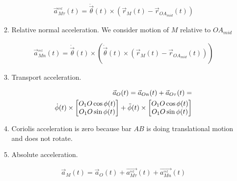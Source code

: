 \begin{enumerate}
\begin{enumerate}
\begin{answer}
\begin{align}
                            \vec{a}^{_{rel}}_{M\tau}(t) =  \ddot{\vec{\theta}}(t) \times (\vec{r}_{M}(t) - \vec{r}_{OA_{mid}}(t))
                        \end{align}
                    \end{answer}
              \item Relative normal acceleration. We consider motion of $M$ relative to $OA_{mid}$
                    \begin{answer}
                        \begin{align}
                            \vec{a}^{_{rel}}_{Mn}(t) =  \dot{\vec{\theta}}(t) \times (\dot{\vec{\theta}}(t) \times (\vec{r}_{M}(t) - \vec{r}_{OA_{mid}}(t)))
                        \end{align}
                    \end{answer}
              \item Transport acceleration.
                    \begin{answer}
                        \begin{align}
                            \vec{a}_{O}(t) = \vec{a}_{On}(t) + \vec{a}_{O\tau}(t) = \notag \\
                            \dot{\phi}(t) \times \begin{bmatrix}
                                O_1O \cos{\phi(t)} \\
                                O_1O \sin{\phi(t)}
                            \end{bmatrix} +
                            \ddot{\phi}(t) \times \begin{bmatrix}
                                O_1O \cos{\phi(t)} \\
                                O_1O \sin{\phi(t)}
                            \end{bmatrix}
                        \end{align}
                    \end{answer}
              \item Coriolis acceleration is zero because bar $AB$ is doing translational motion and does not rotate.
              \item Absolute acceleration.
                    \begin{answer}
                        \begin{align}
                            \vec{a}_{M}(t) = \vec{a}_{O}(t) + \vec{a^{_{rel}}_{M\tau}}(t) + \vec{a^{_{rel}}_{Mn}}(t)
                        \end{align}

\end{answer}
\end{enumerate}
\end{enumerate}
